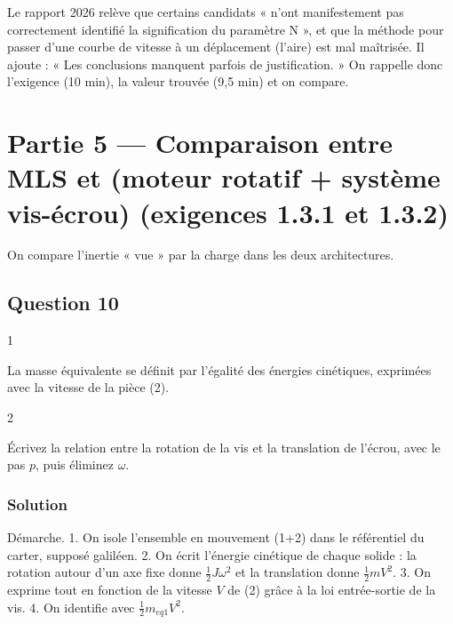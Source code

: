 \documentclass[11pt,a4paper]{article}
\begin{document}
\begin{jury}

Le rapport 2026 relève que certains candidats « n'ont manifestement pas correctement identifié la signification du paramètre N », et que la méthode pour passer d'une courbe de vitesse à un déplacement (l'aire) est mal maîtrisée. Il ajoute : « Les conclusions manquent parfois de justification. » On rappelle donc l'exigence (10 min), la valeur trouvée (9,5 min) et on compare.

\end{jury}

\hypertarget{partie-5-comparaison-entre-mls-et-moteur-rotatif-systuxe8me-vis-uxe9crou-exigences-1.3.1-et-1.3.2}{%
\section{Partie 5 --- Comparaison entre MLS et (moteur rotatif + système vis-écrou) (exigences 1.3.1 et 1.3.2)}\label{partie-5-comparaison-entre-mls-et-moteur-rotatif-systuxe8me-vis-uxe9crou-exigences-1.3.1-et-1.3.2}}

On compare l'inertie « vue » par la charge dans les deux architectures.

\hypertarget{question-10}{%
\subsection{Question 10}\label{question-10}}

\begin{indication}{1}

La masse équivalente se définit par l'égalité des énergies cinétiques, exprimées avec la vitesse de la pièce (2).

\end{indication}

\begin{indication}{2}

Écrivez la relation entre la rotation de la vis et la translation de l'écrou, avec le pas \(p\), puis éliminez \(\omega\).

\end{indication}

\hypertarget{solution-9}{%
\subsubsection{Solution}\label{solution-9}}

Démarche.
1. On isole l'ensemble en mouvement (1+2) dans le référentiel du carter, supposé galiléen.
2. On écrit l'énergie cinétique de chaque solide : la rotation autour d'un axe fixe donne \(\tfrac12 J\omega^2\) et la translation donne \(\tfrac12 mV^2\).
3. On exprime tout en fonction de la vitesse \(V\) de (2) grâce à la loi entrée-sortie de la vis.
4. On identifie avec \(\tfrac12 m_{eq1}V^2\).
\end{document}
